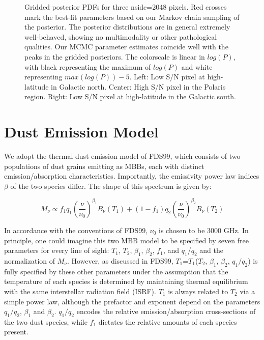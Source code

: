 \documentclass{emulateapj}
\begin{document}
\begin{figure*}
\begin{center}
\caption{Gridded posterior PDFs for three nside=2048 pixels. Red crosses mark 
the best-fit parameters based on our Markov chain sampling of the posterior. 
The posterior distributions are in general extremely well-behaved, showing
no multimodality or other pathological qualities. Our MCMC parameter 
estimates coincide well with the peaks in the gridded posteriors. The 
colorscale is linear in $log(P)$, with black representing the maximum of 
$log(P)$ and white representing $max(log(P))-5$. Left: Low S/N pixel at 
high-latitude in Galactic north. Center: High S/N pixel in the Polaris region. 
Right: Low S/N pixel at high-latitude in the Galactic south.}
\end{center}
\end{figure*}


\section{Dust Emission Model}
\label{sec:modeling}



We adopt the thermal dust emission model of FDS99, which consists of two 
populations of dust grains emitting as MBBs, each with distinct 
emission/absorption characteristics. Importantly, the emissivity power law 
indices $\beta$ of the two species differ. The shape of this spectrum is given 
by:

\begin{equation}
M_{\nu} \propto f_{1}q_{1}(\frac{\nu}{\nu_{0}})^{\beta_1}B_{\nu}(T_1) + (1-f_{1})q_{2}(\frac{\nu}{\nu_0})^{\beta_2}B_{\nu}(T_2)
\end{equation}

 
In accordance with the conventions of FDS99, $\nu_0$ is chosen to be 3000 GHz.
In principle, one could imagine this two MBB model to be specified by seven 
free parameters for every line of sight: $T_1$, $T_2$, $\beta_1$, $\beta_2$, 
$f_1$, and $q_1$/$q_2$ and the normalization of $M_{\nu}$. However, as 
discussed in FDS99, $T_1$=$T_1$($T_2$, $\beta_1$, $\beta_2$, $q_1/q_2$) is 
fully specified by these other parameters under the assumption that the 
temperature of each species is determined by maintaining thermal equilibrium 
with the same interstellar radiation field (ISRF). $T_1$ is always related to 
$T_2$ via a simple power law, although the prefactor and exponent depend on the
 parameters $q_1/q_2$, $\beta_1$ and $\beta_2$. $q_1/q_2$ encodes the
relative emission/absorption cross-sections of the two dust species, while
$f_1$ dictates the relative amounts of each species present.
\end{document}
